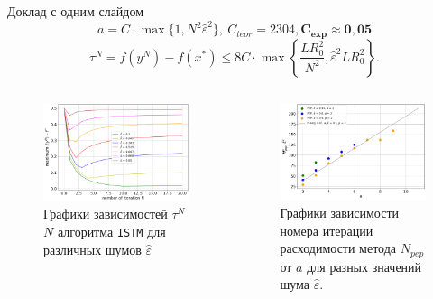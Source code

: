 \documentclass{beamer}
\begin{document}
\begin{frame}{Доклад с одним слайдом}
\begin{equation}\label{formula_for_a}
    a = C \cdot \max{\{1, N^2 \hat{\varepsilon}^2\}},\ C_{teor} = 2304, \mathbf{C_{exp} \approx 0,05}
\end{equation}
\begin{equation}\label{eq:conv_rate_alg1_proper_a}
\tau^N = f(y^N) - f(x^*) \leq 8C \cdot \max \left\{ \frac{LR_0^2}{N^2}, \hat{\varepsilon}^2 L R_0^2 \right\}.
\end{equation}

\begin{columns}[c]
\begin{figure}
\includegraphics[width=1.0\textwidth]{convergence_rate.png}
    \caption{Графики зависимостей $\tau^N$  $N$ алгоритма \texttt{ISTM} для различных шумов $\hat{\varepsilon}$}
\end{figure}
\begin{figure}
\includegraphics[width=1.0\textwidth]{find_c.png}
    \caption{Графики зависимости номера итерации расходимости метода $N_{pep}$ от $a$ для разных значений шума $\hat{\varepsilon}$. }
    \end{figure}
\end{columns}

\end{frame}
\end{document}
